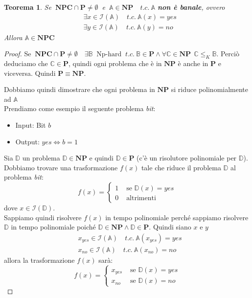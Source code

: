 \documentclass[a4paper]{article}
\newtheorem{thm}{Teorema}[subsection]
\theoremstyle{definition}
\newcommand{\p}{\mathbf{P}}
\newcommand{\np}{\mathbf{NP}}
\newcommand{\npc}{\mathbf{NPC}}
\newcommand{\prob}[1]{\mathbb{#1}}
\newcommand{\instance}[1]{\mathcal{I}(\prob{#1})}
\begin{document}
		\begin{thm}
			Se $\ \npc \cap \p \neq \emptyset\ $ e $\ \prob{A} \in \np \quad t.c. \ \prob{A} $ \textbf{non è banale}, ovvero 
			\begin{align*}
			&\exists x \in \instance{A} \quad t.c. \ \prob{A}(x) = yes\\ 
			&\exists y \in \instance{A} \quad t.c. \ \prob{A}(y) = no 
			\end{align*}
			Allora $ \prob{A} \in \npc $
		\end{thm}
		\begin{proof}
			Se $\ \npc \cap \p \neq \emptyset\quad \exists \prob{B}\ \text{ Np-hard }\ t.c.\ \prob{B}\in\p \wedge \forall \prob{C}\in \np \ \ \prob{C} \leq_K \prob{B} $. Perciò deduciamo che $ \prob{C}\in\p $, quindi ogni problema che è in $ \np $ è anche in $ \p $ e viceversa. Quindi $ \p \equiv \np $.
			
			Dobbiamo quindi dimostrare che ogni problema in $ \np $ si riduce polinomialmente ad $ \prob{A} $\\
			Prendiamo come esempio il seguente problema \textit{bit}:
			\begin{itemize}
				\item Input: Bit $ b $
				\item Output: $ yes \Leftrightarrow b = 1 $ 
			\end{itemize}
			Sia $ \prob{D} $ un problema $ \prob{D} \in \np $ e quindi $ \prob{D} \in \p $ (c'è un risolutore polinomiale per $ \prob{D} $). Dobbiamo trovare una trasformazione $ f(x) $ tale che riduce il problema $ \prob{D} $ al problema \textit{bit}:
			\[	
				f(x) = 
				\begin{cases}
					1 & \mbox{ se } \prob{D}(x) = yes \\
					0 & \mbox{ altrimenti}
				\end{cases}
			\]
			dove $ x \in \instance{D} $.\\
			Sappiamo quindi risolvere $ f(x) $ in tempo polinomiale perché sappiamo risolvere $ \prob{D} $ in tempo polinomiale poiché $ \prob{D} \in \np \wedge \prob{D} \in \p  $. Quindi siano $ x $ e $ y $
			\begin{align*}
				&x_{yes}\in \instance{A} \quad t.c.\ \prob{A}(x_{yes}) = yes\\
				&x_{no}\in \instance{A} \quad t.c.\ \prob{A}(x_{no}) = no
			\end{align*}
			allora la trasformazione $ f(x) $ sarà:
			\[
				f(x) = 
				\begin{cases}
					x_{yes} & \mbox{ se } \prob{D}(x) = yes \\
					x_{no}  & \mbox{ se } \prob{D}(x) = no
				\end{cases}
			\]
		\end{proof}
		
\end{document}

